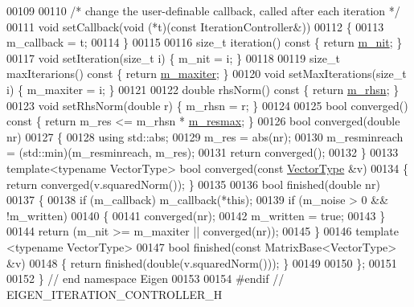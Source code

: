 \begin{DoxyCode}
00109 
00110     \textcolor{comment}{/* change the user-definable callback, called after each iteration */}
00111     \textcolor{keywordtype}{void} setCallback(\textcolor{keywordtype}{void} (*t)(\textcolor{keyword}{const} IterationController&))
00112     \{
00113       m\_callback = t;
00114     \}
00115 
00116     \textcolor{keywordtype}{size\_t} iteration()\textcolor{keyword}{ const }\{ \textcolor{keywordflow}{return} \hyperlink{class_eigen_1_1_iteration_controller_ac9d122615471416cc827a3d8e8ea15f2}{m\_nit}; \}
00117     \textcolor{keywordtype}{void} setIteration(\textcolor{keywordtype}{size\_t} i) \{ m\_nit = i; \}
00118 
00119     \textcolor{keywordtype}{size\_t} maxIterarions()\textcolor{keyword}{ const }\{ \textcolor{keywordflow}{return} \hyperlink{class_eigen_1_1_iteration_controller_a42f72b0f3d490a6ceaa7bc76a51c1471}{m\_maxiter}; \}
00120     \textcolor{keywordtype}{void} setMaxIterations(\textcolor{keywordtype}{size\_t} i) \{ m\_maxiter = i; \}
00121 
00122     \textcolor{keywordtype}{double} rhsNorm()\textcolor{keyword}{ const }\{ \textcolor{keywordflow}{return} \hyperlink{class_eigen_1_1_iteration_controller_a43364d62c43861aff44cb0a86c4615a6}{m\_rhsn}; \}
00123     \textcolor{keywordtype}{void} setRhsNorm(\textcolor{keywordtype}{double} r) \{ m\_rhsn = r; \}
00124 
00125     \textcolor{keywordtype}{bool} converged()\textcolor{keyword}{ const }\{ \textcolor{keywordflow}{return} m\_res <= m\_rhsn * \hyperlink{class_eigen_1_1_iteration_controller_a5342235a082ee820516fd593ee1efeac}{m\_resmax}; \}
00126     \textcolor{keywordtype}{bool} converged(\textcolor{keywordtype}{double} nr)
00127     \{
00128       \textcolor{keyword}{using} std::abs;
00129       m\_res = abs(nr); 
00130       m\_resminreach = (std::min)(m\_resminreach, m\_res);
00131       \textcolor{keywordflow}{return} converged();
00132     \}
00133     \textcolor{keyword}{template}<\textcolor{keyword}{typename} VectorType> \textcolor{keywordtype}{bool} converged(\textcolor{keyword}{const} \hyperlink{struct_vector_type}{VectorType} &v)
00134     \{ \textcolor{keywordflow}{return} converged(v.squaredNorm()); \}
00135 
00136     \textcolor{keywordtype}{bool} finished(\textcolor{keywordtype}{double} nr)
00137     \{
00138       \textcolor{keywordflow}{if} (m\_callback) m\_callback(*\textcolor{keyword}{this});
00139       \textcolor{keywordflow}{if} (m\_noise > 0 && !m\_written)
00140       \{
00141         converged(nr);
00142         m\_written = \textcolor{keyword}{true};
00143       \}
00144       \textcolor{keywordflow}{return} (m\_nit >= m\_maxiter || converged(nr));
00145     \}
00146     \textcolor{keyword}{template} <\textcolor{keyword}{typename} VectorType>
00147     \textcolor{keywordtype}{bool} finished(\textcolor{keyword}{const} MatrixBase<VectorType> &v)
00148     \{ \textcolor{keywordflow}{return} finished(\textcolor{keywordtype}{double}(v.squaredNorm())); \}
00149 
00150 \};
00151 
00152 \} \textcolor{comment}{// end namespace Eigen}
00153 
00154 \textcolor{preprocessor}{#endif // EIGEN\_ITERATION\_CONTROLLER\_H}
\end{DoxyCode}
